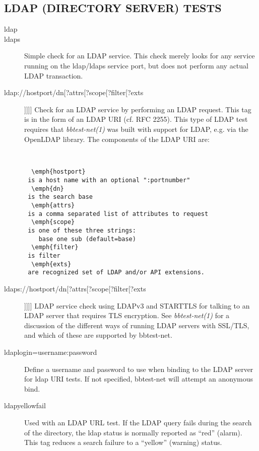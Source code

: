 \subsection{LDAP (DIRECTORY SERVER) TESTS}
\begin{description}
\item[ldap]
\item[ldaps] Simple check for an LDAP service. This check merely looks
  for any service running on the ldap/ldaps service port, but does not
  perform any actual LDAP transaction. 


 

\item[ldap://hostport/dn[?attrs[?scope[?filter[?exts]]]]] Check for an
  LDAP service by performing an LDAP request. This tag is in the form
  of an LDAP URI (cf. RFC 2255). This type of LDAP test requires that
  \emph{bbtest-net(1)} was built with support for LDAP, e.g. via the
  OpenLDAP library. The components of the LDAP URI are:
  \begin{verbatim}


  \emph{hostport}
 is a host name with an optional ":portnumber"
  \emph{dn}
 is the search base
  \emph{attrs}
 is a comma separated list of attributes to request
  \emph{scope}
 is one of these three strings:
    base one sub (default=base)
  \emph{filter}
 is filter
  \emph{exts}
 are recognized set of LDAP and/or API extensions.

\end{verbatim}


 

\item[ldaps://hostport/dn[?attrs[?scope[?filter[?exts]]]]] LDAP
  service check using LDAPv3 and STARTTLS for talking to an LDAP
  server that requires TLS encryption. See \emph{bbtest-net(1)} for a
  discussion of the different ways of running LDAP servers with
  SSL/TLS, and which of these are supported by bbtest-net. 


 

\item[ldaplogin=username:password] Define a username and password to
  use when binding to the LDAP server for ldap URI tests. If not
  specified, bbtest-net will attempt an anonymous bind. 


 

\item[ldapyellowfail] Used with an LDAP URL test. If the LDAP query
  fails during the search of the directory, the ldap status is
  normally reported as ``red'' (alarm). This tag reduces a search
  failure to a ``yellow'' (warning) status. 


 


\end{description}

